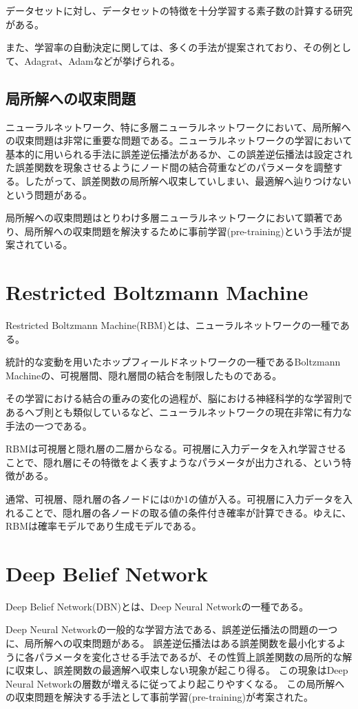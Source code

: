 データセットに対し、データセットの特徴を十分学習する素子数の計算する研究がある。

また、学習率の自動決定に関しては、多くの手法が提案されており、その例として、Adagrat、Adamなどが挙げられる。

\subsection{局所解への収束問題}
ニューラルネットワーク、特に多層ニューラルネットワークにおいて、局所解への収束問題は非常に重要な問題である。ニューラルネットワークの学習において基本的に用いられる手法に誤差逆伝播法があるか、この誤差逆伝播法は設定された誤差関数を現象させるようにノード間の結合荷重などのパラメータを調整する。したがって、誤差関数の局所解へ収束していしまい、最適解へ辿りつけないという問題がある。

局所解への収束問題はとりわけ多層ニューラルネットワークにおいて顕著であり、局所解への収束問題を解決するために事前学習(pre-training)という手法が提案されている。


\section{Restricted Boltzmann Machine}
Restricted Boltzmann Machine(RBM)とは、ニューラルネットワークの一種である。

統計的な変動を用いたホップフィールドネットワークの一種であるBoltzmann Machineの、可視層間、隠れ層間の結合を制限したものである。

その学習における結合の重みの変化の過程が、脳における神経科学的な学習則であるヘブ則とも類似しているなど、ニューラルネットワークの現在非常に有力な手法の一つである。

RBMは可視層と隠れ層の二層からなる。可視層に入力データを入れ学習させることで、隠れ層にその特徴をよく表すようなパラメータが出力される、という特徴がある。

通常、可視層、隠れ層の各ノードには0か1の値が入る。可視層に入力データを入れることで、隠れ層の各ノードの取る値の条件付き確率が計算できる。ゆえに、RBMは確率モデルであり生成モデルである。

\section{Deep Belief Network}
Deep Belief Network(DBN)とは、Deep Neural Networkの一種である。

Deep Neural Networkの一般的な学習方法である、誤差逆伝播法の問題の一つに、局所解への収束問題がある。
誤差逆伝播法はある誤差関数を最小化するように各パラメータを変化させる手法であるが、その性質上誤差関数の局所的な解に収束し、誤差関数の最適解へ収束しない現象が起こり得る。
この現象はDeep Neural Networkの層数が増えるに従ってより起こりやすくなる。
この局所解への収束問題を解決する手法として事前学習(pre-training)が考案された。


